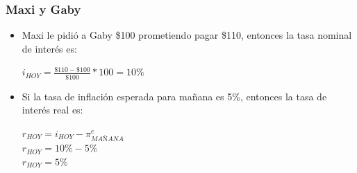\documentclass{beamer}
\begin{document}
\begin{frame}
\frametitle{Maxi y Gaby}
\begin{itemize}
    \item Maxi le pidió a Gaby \$100 prometiendo pagar \$110, entonces la tasa nominal de interés es:
    \vspace{2mm}
    \begin{center}
        $i_{HOY}=\frac{\$110 - \$100}{\$100} * 100 = 10\%$
    \end{center}
        \vspace{2mm}
    \item Si la tasa de inflación esperada para mañana es 5\%, entonces la tasa de interés real es: \\
    \begin{center}
        $r_{HOY} = i_{HOY}-\pi_{MAÑANA}^e$ \\
        \vspace{2mm}
        $r_{HOY} = 10\%-5\% $ \\
        \vspace{2mm}
        $r_{HOY} = 5\%$
    \end{center}
\end{itemize}
\end{frame}







\end{document}
